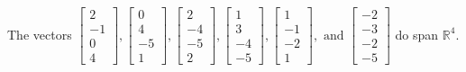 \begin{exercise}
\begin{exerciseStatement}
  \end{exerciseStatement}
  \begin{exerciseAnswer}
   The vectors \(\left[\begin{array}{r}
2 \\
-1 \\
0 \\
4
\end{array}\right] , \left[\begin{array}{r}
0 \\
4 \\
-5 \\
1
\end{array}\right] , \left[\begin{array}{r}
2 \\
-4 \\
-5 \\
2
\end{array}\right] , \left[\begin{array}{r}
1 \\
3 \\
-4 \\
-5
\end{array}\right] , \left[\begin{array}{r}
1 \\
-1 \\
-2 \\
1
\end{array}\right] , \text{ and } \left[\begin{array}{r}
-2 \\
-3 \\
-2 \\
-5
\end{array}\right]\) 
  	 do  
	span \(\mathbb{R}^4\).
  


  \end{exerciseAnswer}
\end{exercise}